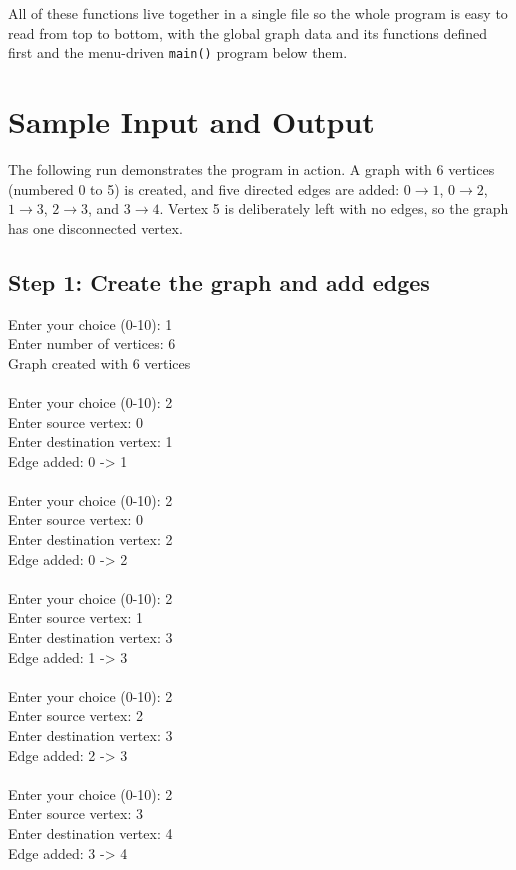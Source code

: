 \documentclass[11pt]{article}
\begin{document}
All of these functions live together in a single file so the whole program is easy to read from top to bottom, with the global graph data and its functions defined first and the menu-driven \texttt{main()} program below them.

\section{Sample Input and Output}

The following run demonstrates the program in action. A graph with 6 vertices (numbered 0 to 5) is created, and five directed edges are added: $0 \to 1$, $0 \to 2$, $1 \to 3$, $2 \to 3$, and $3 \to 4$. Vertex 5 is deliberately left with no edges, so the graph has one disconnected vertex.

\subsection*{Step 1: Create the graph and add edges}
\begin{terminal}
Enter your choice (0-10): 1\\
Enter number of vertices: 6\\
Graph created with 6 vertices\\
\ \\
Enter your choice (0-10): 2\\
Enter source vertex: 0\\
Enter destination vertex: 1\\
Edge added: 0 -> 1\\
\ \\
Enter your choice (0-10): 2\\
Enter source vertex: 0\\
Enter destination vertex: 2\\
Edge added: 0 -> 2\\
\ \\
Enter your choice (0-10): 2\\
Enter source vertex: 1\\
Enter destination vertex: 3\\
Edge added: 1 -> 3\\
\ \\
Enter your choice (0-10): 2\\
Enter source vertex: 2\\
Enter destination vertex: 3\\
Edge added: 2 -> 3\\
\ \\
Enter your choice (0-10): 2\\
Enter source vertex: 3\\
Enter destination vertex: 4\\
Edge added: 3 -> 4
\end{terminal}
\end{document}
